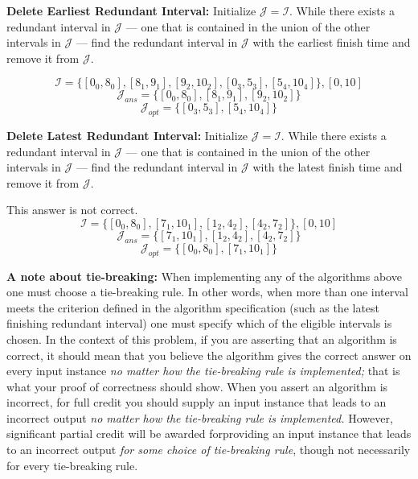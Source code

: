 \documentclass{hw}
\begin{document}
\begin{problem}
        \begin{subproblem}
            \textbf{Delete Earliest Redundant Interval:} Initialize $\mathcal{J}=\mathcal{I}$. While there exists a redundant interval in $\mathcal{J}$ --- one that is contained in the union of the other intervals in $\mathcal{J}$ --- find the redundant interval in $\mathcal{J}$ with the earliest finish time and remove it from $\mathcal{J}$.
        \end{subproblem}

        \begin{solution}
            $$
            \mathcal{I} = \{[0_0,8_0], [8_1,9_1], [9_2,10_2], [0_3,5_3], [5_4,10_4]\}, [0,10]
            $$
            $$
            \mathcal{J}_{ans} = \{[0_0,8_0], [8_1,9_1], [9_2,10_2]\}
            $$
            $$
            \mathcal{J}_{opt} = \{[0_3,5_3], [5_4,10_4]\}
            $$
        \end{solution}
    
        \begin{subproblem}
            \textbf{Delete Latest Redundant Interval:} Initialize $\mathcal{J}=\mathcal{I}$. While there exists a redundant interval in $\mathcal{J}$ --- one that is contained in the union of the other intervals in $\mathcal{J}$ --- find the redundant interval in $\mathcal{J}$ with the latest finish time and remove it from $\mathcal{J}$.
        \end{subproblem}

        \begin{solution}
            This answer is not correct.
            $$
            \mathcal{I} = \{[0_0,8_0],[7_1,10_1],[1_2,4_2],[4_2,7_2]\}, [0,10]
            $$
            $$
            \mathcal{J}_{ans} = \{[7_1,10_1],[1_2,4_2],[4_2,7_2]\}
            $$
            $$
            \mathcal{J}_{opt} = \{[0_0,8_0],[7_1,10_1]\}
            $$
        \end{solution}

    {\bf A note about tie-breaking:} When implementing any of the algorithms above one must choose a tie-breaking rule. In other words, when more than one interval meets the criterion defined in the algorithm specification (such as the latest finishing redundant interval) one must specify which of the eligible intervals is chosen. In the context of this problem, if you are asserting that an algorithm is correct, it should mean that you believe the algorithm gives the correct answer on every input instance {\em no matter how the tie-breaking rule is implemented;} that is what your proof of correctness should show. When you assert an algorithm is incorrect, for full credit you should supply an input instance that leads to an incorrect output {\em no matter how the tie-breaking rule is implemented.} However, significant partial credit will be awarded forproviding an input instance that leads to an incorrect output {\em for some choice of tie-breaking rule}, though not necessarily for every tie-breaking rule.

\end{problem}
\newpage
\end{document}
